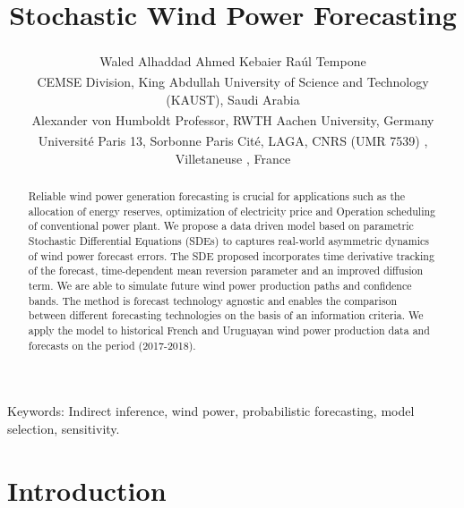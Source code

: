 \documentclass[10pt,twocolumn,letterpaper]{article}
\begin{document}
\title{ Stochastic Wind Power Forecasting }  %

\author{ Waled Alhaddad\textsuperscript{\textasteriskcentered} \qquad Ahmed Kebaier\textsuperscript{\ddag} \qquad Ra\'ul  Tempone\textsuperscript{\textasteriskcentered}\textsuperscript{\textdagger} \\
\textsuperscript{\textasteriskcentered}CEMSE Division, King Abdullah University of Science and Technology (KAUST), Saudi Arabia \\ \textsuperscript{\textdagger}Alexander von Humboldt Professor, RWTH Aachen University,  Germany
 \\ \textsuperscript{\ddag}Université Paris 13, Sorbonne Paris Cité, LAGA, CNRS (UMR 7539) , Villetaneuse , France }

\maketitle
{\color{red}Keywords: Indirect inference, wind power, probabilistic forecasting, model selection, sensitivity.}

\begin{abstract}

Reliable wind power generation forecasting is crucial for applications such as the allocation of energy reserves, optimization of electricity price and Operation scheduling of conventional power plant. We propose a data driven model based on parametric Stochastic Differential Equations (SDEs) to captures real-world asymmetric dynamics of wind power forecast errors. The SDE proposed incorporates time derivative tracking of the forecast, time-dependent mean reversion parameter and an improved diffusion term. We are able to simulate future wind power production paths and confidence bands. The method is forecast technology agnostic and enables the comparison between different forecasting technologies on the basis of an information criteria. We apply the model to historical French and Uruguayan wind power production data and forecasts on the period (2017-2018).


\end{abstract}

\section{Introduction}
\end{document}
